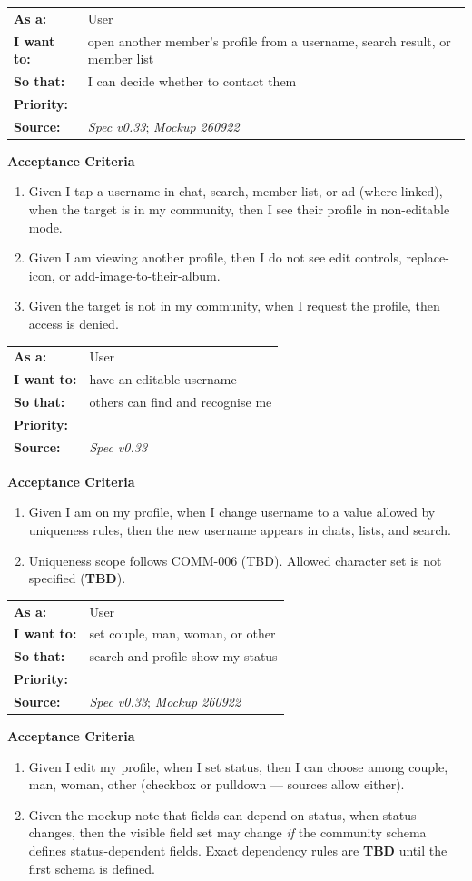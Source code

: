\documentclass[11pt,a4paper]{article}
\makeatletter
\newcommand{\priPzero}{\colorbox{p0}{\makebox[4.6em]{\textcolor{white}{\scriptsize\bfseries P0 V1}}}}
\newcommand{\srcSpec}{\textit{Spec v0.33}}
\newcommand{\srcMock}{\textit{Mockup 260922}}
\newenvironment{story}[1]{%
  \Needspace{10\baselineskip}%
  \vspace{0.7em}%
  \noindent
  \colorbox{navy}{\makebox[\dimexpr\textwidth-2\fboxsep\relax][l]{\textcolor{white}{\bfseries\ #1}}}%
  \par\vspace{0.35em}%
}{\par\vspace{0.55em}}
\newcommand{\storymeta}[5]{%
  \noindent
  \begin{tabularx}{\textwidth}{@{}>{\bfseries}l X@{}}
    As a: & #1 \\
    I want to: & #2 \\
    So that: & #3 \\
    Priority: & #4 \\
    Source: & #5 \\
  \end{tabularx}
  \par\vspace{0.3em}
}
\newcommand{\achead}{\noindent\textbf{Acceptance Criteria}\par}
\makeatother
\begin{document}
\begin{story}{PROF-002 --- View another member's profile}
\storymeta{User}{open another member's profile from a username, search result, or member list}{I can decide whether to contact them}{\priPzero}{\srcSpec; \srcMock}
\achead
\begin{enumerate}
  \item Given I tap a username in chat, search, member list, or ad (where linked), when the target is in my community, then I see their profile in non-editable mode.
  \item Given I am viewing another profile, then I do not see edit controls, replace-icon, or add-image-to-their-album.
  \item Given the target is not in my community, when I request the profile, then access is denied.
\end{enumerate}
\end{story}

\begin{story}{PROF-003 --- Username}
\storymeta{User}{have an editable username}{others can find and recognise me}{\priPzero}{\srcSpec}
\achead
\begin{enumerate}
  \item Given I am on my profile, when I change username to a value allowed by uniqueness rules, then the new username appears in chats, lists, and search.
  \item Uniqueness scope follows COMM-006 (TBD). Allowed character set is not specified (\textbf{TBD}).
\end{enumerate}
\end{story}

\begin{story}{PROF-004 --- Status: man / woman / couple / other}
\storymeta{User}{set couple, man, woman, or other}{search and profile show my status}{\priPzero}{\srcSpec; \srcMock}
\achead
\begin{enumerate}
  \item Given I edit my profile, when I set status, then I can choose among couple, man, woman, other (checkbox or pulldown --- sources allow either).
  \item Given the mockup note that fields can depend on status, when status changes, then the visible field set may change \emph{if} the community schema defines status-dependent fields. Exact dependency rules are \textbf{TBD} until the first schema is defined.
\end{enumerate}
\end{story}
\end{document}

